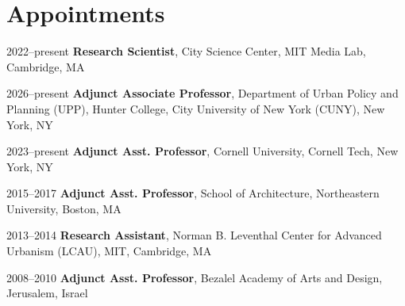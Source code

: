 \section*{Appointments}

\begin{tablist}

    \item[2022--present]\tab\textbf{Research Scientist},
    City Science Center, MIT Media Lab, Cambridge, MA

    \item[2026--present]\tab\textbf{Adjunct Associate Professor},
    Department of Urban Policy and Planning (UPP), Hunter College, City University of New York (CUNY), New York, NY

    \item[2023--present]\tab\textbf{Adjunct Asst. Professor},
    Cornell University, Cornell Tech, New York, NY

    \item[2015--2017]\tab\textbf{Adjunct Asst. Professor},
    School of Architecture, Northeastern University, Boston, MA

    \item[2013--2014]\tab\textbf{Research Assistant},
    Norman B. Leventhal Center for Advanced Urbanism (LCAU), MIT, Cambridge, MA

    \item[2008--2010]\tab\textbf{Adjunct Asst. Professor},
    Bezalel Academy of Arts and Design, Jerusalem, Israel

\end{tablist}
